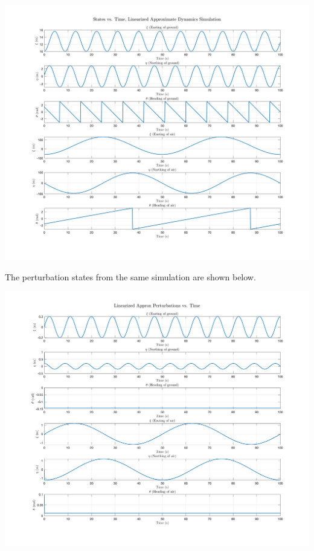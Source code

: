 \documentclass[paper=a4, fontsize=11pt]{scrartcl} %
\numberwithin{equation}{section} %
\numberwithin{figure}{section} %
\numberwithin{table}{section} %
\begin{document}
\begin{framed}
\begin{minipage}[t]{1\linewidth}
   \vspace{-2ex}
   \includegraphics[scale=0.2]{LinearizedFullStateDynamics.png}
   \centering
\end{minipage}
 
 


The perturbation states from the same simulation are shown below.
\begin{minipage}[t]{1\linewidth}
   \vspace{-2ex}
   \centering
   \includegraphics[scale=0.2]{LinearizedPerturbationStateDynamics.png}
\end{minipage}


\end{framed}
\end{document}
